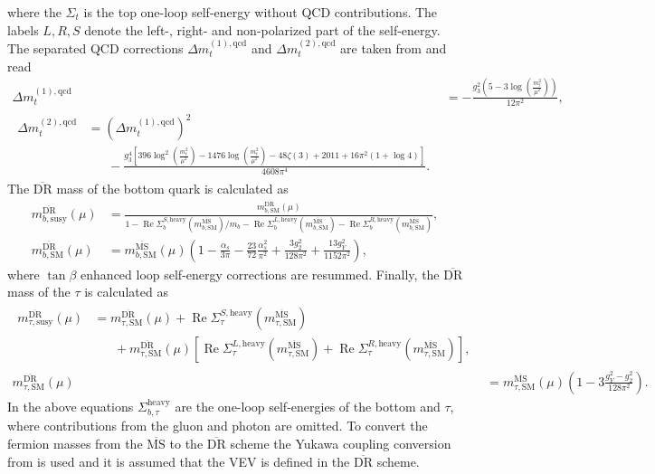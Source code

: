 \documentclass[final,3p,11pt,pdflatex]{elsarticle}
\newcommand{\textoverline}[1]{$\overline{\mbox{#1}}$}
\newcommand{\DRbar}{\textoverline{DR}\xspace}
\newcommand{\MSbar}{\textoverline{MS}\xspace}
\DeclareMathOperator{\re}{Re}
\begin{document}
%
where the $\Sigma_{t}$ is the top one-loop self-energy without QCD
contributions.  The labels $L,R,S$ denote the left-, right- and
non-polarized part of the self-energy.  The separated QCD corrections
$\Delta m_t^{(1),\text{qcd}}$ and $\Delta m_t^{(2),\text{qcd}}$ are
taken from \cite{Bednyakov:2002sf} and read
%
\begin{align}
  \Delta m_t^{(1),\text{qcd}} &= -\frac{g_3^2 \left(5-3 \log\left(\frac{m_t^2}{\mu^2}\right)\right)}{12 \pi^2},\\
  \begin{split}
    \Delta m_t^{(2),\text{qcd}} &= \left(\Delta
      m_t^{(1),\text{qcd}}\right)^2 \\
    &\phantom{=\;} - \frac{g_3^4 \left[396
        \log^2\left(\frac{m_t^2}{\mu^2}\right)-1476
        \log\left(\frac{m_t^2}{\mu^2}\right)-48 \zeta(3)+2011+16 \pi
        ^2 (1+\log 4)\right]}{4608 \pi^4}.
  \end{split}
\end{align}
%
The \DRbar mass of the bottom quark is calculated as
\cite{Baer:2002ek,Skands:2003cj}
%
\begin{align}
  m_{b,\text{susy}}^{\text{\DRbar}}(\mu) &=
  \frac{m_{b,\text{SM}}^{\text{\DRbar}}(\mu)}{1 -
    \re\Sigma_{b}^{S,\text{heavy}}(m_{b,\text{SM}}^\text{\MSbar})/m_b
    - \re\Sigma_{b}^{L,\text{heavy}}(m_{b,\text{SM}}^\text{\MSbar}) -
    \re\Sigma_{b}^{R,\text{heavy}}(m_{b,\text{SM}}^\text{\MSbar})} ,\\
  m_{b,\text{SM}}^{\text{\DRbar}}(\mu) &=
  m_{b,\text{SM}}^{\text{\MSbar}}(\mu) \left(1 - \frac{\alpha_s}{3
      \pi} - \frac{23}{72} \frac{\alpha_s^2}{\pi^2} + \frac{3
      g_2^2}{128 \pi^2} + \frac{13 g_Y^2}{1152 \pi^2}\right) ,
\end{align}
%
where $\tan\beta$ enhanced loop self-energy corrections are resummed.
Finally, the \DRbar mass of the $\tau$ is calculated as
%
\begin{align}
  \begin{split}
    m_{\tau,\text{susy}}^{\text{\DRbar}}(\mu) &=
    m_{\tau,\text{SM}}^{\text{\DRbar}}(\mu) +
    \re\Sigma_{\tau}^{S,\text{heavy}}(m_{\tau,\text{SM}}^\text{\MSbar}) \\
    &\phantom{=\;} + m_{\tau,\text{SM}}^{\text{\DRbar}}(\mu) \left[
      \re\Sigma_{\tau}^{L,\text{heavy}}(m_{\tau,\text{SM}}^\text{\MSbar})
      +
      \re\Sigma_{\tau}^{R,\text{heavy}}(m_{\tau,\text{SM}}^\text{\MSbar})
    \right] ,
  \end{split}\\
  m_{\tau,\text{SM}}^{\text{\DRbar}}(\mu) &= m_{\tau,\text{SM}}^{\text{\MSbar}}(\mu)
  \left(1 - 3 \frac{g_Y^2 - g_2^2}{128 \pi^2}\right).
\end{align}
%
In the above equations $\Sigma_{b,\tau}^{\text{heavy}}$ are the
one-loop self-energies of the bottom and $\tau$, where contributions
from the gluon and photon are omitted.  To convert the fermion masses
from the \MSbar to the \DRbar scheme the Yukawa coupling conversion
from \cite{Martin:1993yx} is used and it is assumed that the VEV is
defined in the \DRbar scheme.
\end{document}
